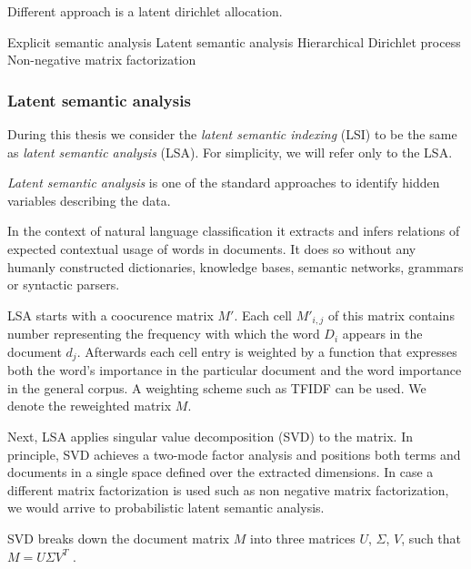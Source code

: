         Different approach is a latent dirichlet allocation.
        
        Explicit semantic analysis
        Latent semantic analysis
        Hierarchical Dirichlet process
        Non-negative matrix factorization
        
        
        \subsubsection{Latent semantic analysis}
        
        During this thesis we consider the \emph{latent semantic indexing} (LSI) to be the same as \emph{latent semantic analysis} (LSA).
        For simplicity, we will refer only to the LSA.
        
        \emph{Latent semantic analysis} is one of the standard approaches to identify hidden variables describing the data.
        
        In the context of natural language classification it extracts and infers relations of expected contextual usage of words in documents.
        It does so without any humanly constructed dictionaries, knowledge bases, semantic networks, grammars or syntactic parsers.
        
        LSA starts with a coocurence matrix $M'$. 
        Each cell $M'_{i,j}$ of this matrix contains number representing the frequency with  which  the  word $D_i$ appears in the document $d_j$.
        Afterwards each cell entry is weighted by a function that expresses both the word's importance in the particular document and the word importance in the general corpus.
        A weighting scheme such as TFIDF can be used.
        We denote the reweighted matrix $M$. 
        
        Next, LSA applies singular value decomposition (SVD) to the matrix.
        In principle, SVD achieves a two-mode factor analysis and positions both terms and documents in a single space defined over the extracted dimensions.
        In case a different matrix factorization is used such as non negative matrix factorization, we would arrive to probabilistic latent semantic analysis.
        
        SVD breaks down the document matrix $M$ into three matrices $U$, $\Sigma$, $V$, 
        such that $M=U \Sigma V^T$ \cite{papadimitriou2000latent} %
        \cite{deerwester1990indexing} %
        \cite{maas2011learning} %
        \cite{wiemer2004latent} %
        \cite{landauer1998introduction}. %

